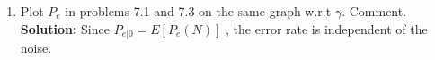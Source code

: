 \documentclass[journal,12pt,twocolumn]{IEEEtran}
\numberwithin{equation}{section}
\renewcommand\thesection{\arabic{section}}
\providecommand{\sbrak}[1]{\ensuremath{{}\left[#1\right]}}
\providecommand{\brak}[1]{\ensuremath{\left(#1\right)}}
\newcommand{\solution}{\noindent \textbf{\\ Solution: }}
\begin{document}
\begin{enumerate}[label=\thesection.\arabic*
        ,ref=\thesection.\theenumi]
          \begin{align}
              E\sbrak{g(X)} = \int_{-\infty}^{\infty}g(x)p_X(x)dx
          \end{align}
          Find $P_e = E\sbrak{P_e(N)}$.
          \solution
          We write,
          \begin{align}
              P_e & = \int_{0}^{\infty}F_A(x)f_N(x)dx                                                                            \\
                  & = \int_{0}^{\infty}(1 - e^{-\frac{x^2}{\gamma}})\frac{1}{\sqrt{2\pi}}e^{-\frac{x^2}{2}}dx                    \\
                  & = \frac{1}{2} - \frac{1}{\sqrt{2\pi}}\int_{0}^{\infty}\exp{\brak{-\frac{x^2}{\frac{2\gamma}{\gamma + 2}}}}dx \\
                  & = \frac{1}{2}\brak{1 - \sqrt{\frac{\gamma}{\gamma + 2}}}
              \label{eq:err-ral}
          \end{align}
          where $f_N$ denotes the standard normal distribution.
    \item Plot $P_e$ in problems 7.1 and 7.3 on the same graph w.r.t $\gamma$. Comment.
          \solution Since $P_{e|0} = E\sbrak{P_e(N)}$ , the error rate is independent of the noise.
\end{enumerate}
\end{document}
